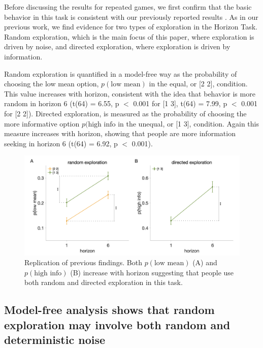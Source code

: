 \documentclass[12pt]{article}
\begin{document}
	Before discussing the results for repeated games, we first confirm that the basic behavior in this task is consistent with our previously reported results \citep{wilson2014}. As in our previous work, we find evidence for two types of exploration in the Horizon Task.  Random exploration, which is the main focus of this paper, where exploration is driven by noise, and directed exploration, where exploration is driven by information. 
	
	Random exploration is quantified in a model-free way as the probability of choosing the low mean option, $p(\mbox{low mean})$ in the equal, or [2 2], condition. This value increases with horizon, consistent with the idea that behavior is more random in horizon 6 (t(64) = 6.55, p $<$ 0.001 for [1 3], t(64) = 7.99, p $<$ 0.001 for [2 2]).  Directed exploration, is measured as the probability of choosing the more informative option $p(\mbox{high info}$ in the unequal, or [1 3], condition. Again this measure increases with horizon, showing that people are more information seeking in horizon 6 (t(64) = 6.92, p $<$ 0.001).
	
	\begin{figure}[H]
		\begin{center}
			\includegraphics[width=\textwidth]{figures/RanDetNoise_modelfree.png}
			\caption{
			Replication of previous findings. Both  $p(\mbox{low mean})$ (A) and $p(\mbox{high info})$ (B) increase with horizon suggesting that people use both random and directed exploration in this task.  }
			\label{fig:modelfree}
		\end{center}
	\end{figure}
	
	\subsection*{Model-free analysis shows that random exploration may involve both random and deterministic noise}
	
\end{document}
